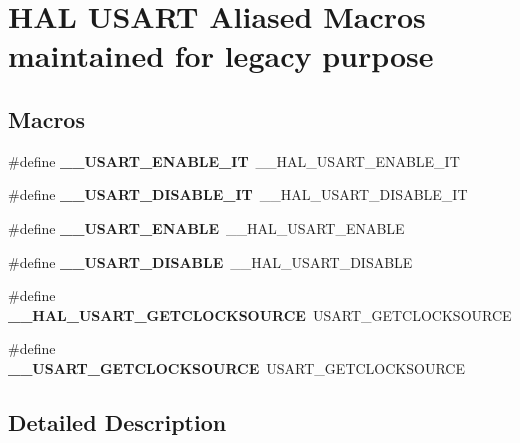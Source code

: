 \hypertarget{group___h_a_l___u_s_a_r_t___aliased___macros}{}\section{H\+AL U\+S\+A\+RT Aliased Macros maintained for legacy purpose}
\label{group___h_a_l___u_s_a_r_t___aliased___macros}
\subsection*{Macros}
\begin{DoxyCompactItemize}
\item 
\mbox{\label{group___h_a_l___u_s_a_r_t___aliased___macros_gab99081ba6bb70f397ab2def3f644c3c1}} 
\#define {\bfseries \+\_\+\+\_\+\+U\+S\+A\+R\+T\+\_\+\+E\+N\+A\+B\+L\+E\+\_\+\+IT}~\+\_\+\+\_\+\+H\+A\+L\+\_\+\+U\+S\+A\+R\+T\+\_\+\+E\+N\+A\+B\+L\+E\+\_\+\+IT
\item 
\mbox{\label{group___h_a_l___u_s_a_r_t___aliased___macros_ga12ae7c59b7d95f0f8606fca7bba57db8}} 
\#define {\bfseries \+\_\+\+\_\+\+U\+S\+A\+R\+T\+\_\+\+D\+I\+S\+A\+B\+L\+E\+\_\+\+IT}~\+\_\+\+\_\+\+H\+A\+L\+\_\+\+U\+S\+A\+R\+T\+\_\+\+D\+I\+S\+A\+B\+L\+E\+\_\+\+IT
\item 
\mbox{\label{group___h_a_l___u_s_a_r_t___aliased___macros_gae03c01e0ee50608e887842bacbf5b361}} 
\#define {\bfseries \+\_\+\+\_\+\+U\+S\+A\+R\+T\+\_\+\+E\+N\+A\+B\+LE}~\+\_\+\+\_\+\+H\+A\+L\+\_\+\+U\+S\+A\+R\+T\+\_\+\+E\+N\+A\+B\+LE
\item 
\mbox{\label{group___h_a_l___u_s_a_r_t___aliased___macros_gac894c090835b348469f36bfed6e78fbd}} 
\#define {\bfseries \+\_\+\+\_\+\+U\+S\+A\+R\+T\+\_\+\+D\+I\+S\+A\+B\+LE}~\+\_\+\+\_\+\+H\+A\+L\+\_\+\+U\+S\+A\+R\+T\+\_\+\+D\+I\+S\+A\+B\+LE
\item 
\mbox{\label{group___h_a_l___u_s_a_r_t___aliased___macros_ga0ed768f9a18f877413306078c442a2a5}} 
\#define {\bfseries \+\_\+\+\_\+\+H\+A\+L\+\_\+\+U\+S\+A\+R\+T\+\_\+\+G\+E\+T\+C\+L\+O\+C\+K\+S\+O\+U\+R\+CE}~U\+S\+A\+R\+T\+\_\+\+G\+E\+T\+C\+L\+O\+C\+K\+S\+O\+U\+R\+CE
\item 
\mbox{\label{group___h_a_l___u_s_a_r_t___aliased___macros_gaa00a53bf6bc2bee096abb57d4ace2384}} 
\#define {\bfseries \+\_\+\+\_\+\+U\+S\+A\+R\+T\+\_\+\+G\+E\+T\+C\+L\+O\+C\+K\+S\+O\+U\+R\+CE}~U\+S\+A\+R\+T\+\_\+\+G\+E\+T\+C\+L\+O\+C\+K\+S\+O\+U\+R\+CE
\end{DoxyCompactItemize}


\subsection{Detailed Description}
